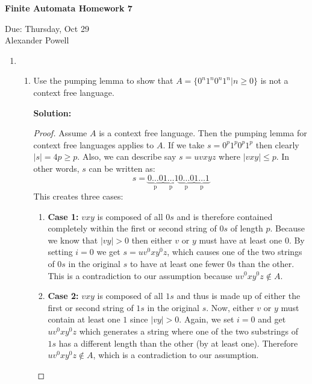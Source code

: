 \documentclass[11pt]{article}
\begin{document}
\begin{center}             %
\begin{LARGE}
{\bf Finite Automata Homework 7}
\end{LARGE}
\vskip 0.25cm      %

Due: Thursday, Oct 29\\  %
Alexander Powell
\end{center}

\begin{enumerate}

\item
\begin{enumerate}
\item

Use the pumping lemma to show that $A = \{ 0^n1^n0^n1^n | n \geq 0 \}$ is not a context free language.  

\textbf{Solution: }

\begin{proof}

Assume $A$ is a context free language.  Then the pumping lemma for context free languages applies to $A$.  If we take $s = 0^p1^p0^p1^p$ then clearly $|s| = 4p \geq p$.  Also, we can describe say $s = uvxyz$ where $|vxy| \leq p$.  In other words, $s$ can be written as:
$$s = \underbrace{0 \ldots 0}_\text{p}\underbrace{1 \ldots 1}_\text{p}\underbrace{0 \ldots 0}_\text{p}\underbrace{1 \ldots 1}_\text{p}$$
This creates three cases:
\begin{enumerate}
\item\textbf{Case 1: } $vxy$ is composed of all $0s$ and is therefore contained completely within the first or second string of $0s$ of length $p$.  Because we know that $|vy| > 0$ then either $v$ or $y$ must have at least one $0$.  By setting $i = 0$ we get $s = uv^0xy^0z$, which causes one of the two strings of $0s$ in the original $s$ to have at least one fewer $0s$ than the other.  This is a contradiction to our assumption because $uv^0xy^0z \not \in A$.  

\item\textbf{Case 2: } $vxy$ is composed of all $1s$ and thus is made up of either the first or second string of $1s$ in the original $s$.  Now, either $v$ or $y$ must contain at least one $1$ since $|vy| > 0$.  Again, we set $i=0$ and get $uv^0xy^0z$ which generates a string where one of the two substrings of $1s$ has a different length than the other (by at least one).  Therefore $uv^0xy^0z \not \in A$, which is a contradiction to our assumption.  


\end{enumerate}
\end{proof}
\end{enumerate}
\end{enumerate}
\end{document}
